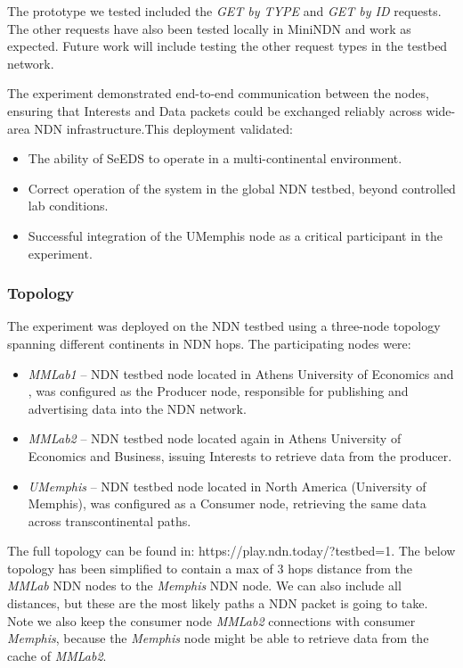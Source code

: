 \documentclass{article}
\begin{document}
The prototype we tested included the \emph{GET by TYPE} and \emph{GET by ID} requests. The other requests have also been tested locally in MiniNDN and work as expected. Future work will include testing the other request types in the testbed network.

The experiment demonstrated end-to-end communication between the nodes, ensuring that Interests and Data packets could be exchanged reliably across wide-area NDN infrastructure.This deployment validated:

\begin{itemize}
    \item The ability of SeEDS to operate in a multi-continental environment.
    \item Correct operation of the system in the global NDN testbed, beyond controlled lab conditions.
    \item Successful integration of the UMemphis node as a critical participant in the experiment.
\end{itemize}

\subsubsection{Topology}

The experiment was deployed on the NDN testbed using a three-node topology spanning different continents in NDN hops. The participating nodes were:

\begin{itemize}
    \item \emph{MMLab1} – NDN testbed node located in Athens University of Economics and , was configured as the Producer node, responsible for publishing and advertising data into the NDN network.
    \item \emph{MMLab2} – NDN testbed node located again in Athens University of Economics and Business, issuing Interests to retrieve data from the producer.
    \item \emph{UMemphis} – NDN testbed node located in North America (University of Memphis), was configured as a Consumer node, retrieving the same data across transcontinental paths.
\end{itemize}

The full topology can be found in: https://play.ndn.today/?testbed=1. The below topology has been simplified to contain a max of 3 hops distance from the \emph{MMLab} NDN nodes to the \emph{Memphis} NDN node. We can also include all distances, but these are the most likely paths a NDN packet is going to take. Note we also keep the consumer node \emph{MMLab2} connections with consumer \emph{Memphis}, because the \emph{Memphis} node might be able to retrieve data from the cache of \emph{MMLab2}.
\end{document}
